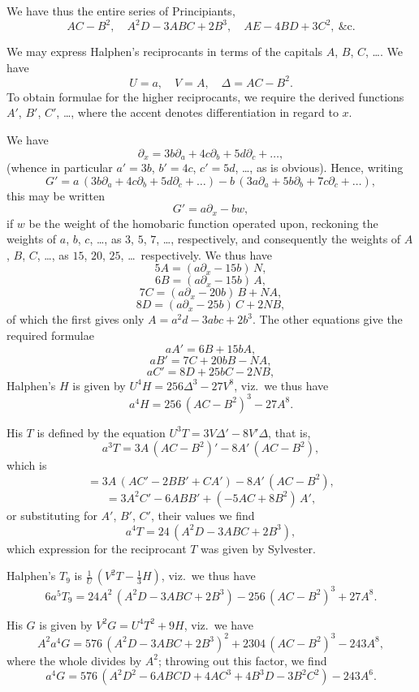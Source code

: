 \documentclass[11pt]{article}
\begin{document}
We have thus the entire series of Principiants,
\[
A C - B^2,\quad A^2 D - 3 A B C + 2 B^3,\quad A E - 4 B D + 3 C^2,\ \&\mathrm{c}.
\]

We may express Halphen's reciprocants in terms of the capitals $A$, $B$, $C$, \ldots. We have
\[
U = a,\quad V = A,\quad \Delta = A C - B^2.
\]
To obtain formulae for the higher reciprocants, we require the derived functions $A'$, $B'$, $C'$, \ldots, where the accent denotes differentiation in regard to $x$.

We have
\[
\partial_x = 3 b\partial_a + 4 c\partial_b + 5 d\partial_c + \ldots,
\]
(whence in particular $a' = 3 b$, $b' = 4 c$, $c' = 5 d$, \ldots, as is obvious). Hence, writing
\[
G' = a\,(3 b\partial_a + 4 c\partial_b + 5 d\partial_c + \ldots) - b\,(3 a\partial_a + 5 b\partial_b + 7 c\partial_c + \ldots),
\]
this may be written
\[
G' = a\partial_x - b w,
\]
if $w$ be the weight of the homobaric function operated upon, reckoning the weights of $a$, $b$, $c$, \ldots, as $3$, $5$, $7$, \ldots, respectively, and consequently the weights of $A$, $B$, $C$, \ldots, as $15$, $20$, $25$, \ldots\ respectively. We thus have
\[
5 A = (a\partial_x - 15 b)\,N,
\]
\[
6 B = (a\partial_x - 15 b)\,A,
\]
\[
7 C = (a\partial_x - 20 b)\,B + N A,
\]
\[
8 D = (a\partial_x - 25 b)\,C + 2 N B,
\]
of which the first gives only $A = a^2 d - 3 a b c + 2 b^3$. The other equations give the required formulae
\[
a A' = 6 B + 15 b A,
\]
\[
a B' = 7 C + 20 b B - N A,
\]
\[
a C' = 8 D + 25 b C - 2 N B,
\]
Halphen's $H$ is given by $U^4 H = 256 \Delta^3 - 27 V^8$, viz.\ we thus have
\[
a^4 H = 256\,(A C - B^2)^3 - 27 A^8.
\]

His $T$ is defined by the equation $U^3 T = 3 V \Delta' - 8 V' \Delta$, that is,
\[
a^3 T = 3 A\,(A C - B^2)' - 8 A'\,(A C - B^2),
\]
which is
\[
= 3 A\,(A C' - 2 B B' + C A') - 8 A'\,(A C - B^2),
\]
\[
= 3 A^2 C' - 6 A B B' + (-5 A C + 8 B^2)\,A',
\]
or substituting for $A'$, $B'$, $C'$, their values we find
\[
a^4 T = 24\,(A^2 D - 3 A B C + 2 B^3),
\]
which expression for the reciprocant $T$ was given by Sylvester.

Halphen's $T_9$ is $\tfrac{1}{U}\,(V^2 T - \tfrac{1}{3} H)$, viz.\ we thus have
\[
6 a^5 T_9 = 24 A^2\,(A^2 D - 3 A B C + 2 B^3) - 256\,(A C - B^2)^3 + 27 A^8.
\]

His $G$ is given by $V^2 G = U^4 T^2 + 9 H$, viz.\ we have
\[
A^2 a^4 G = 576\,(A^2 D - 3 A B C + 2 B^3)^2 + 2304\,(A C - B^2)^3 - 243 A^8,
\]
where the whole divides by $A^2$; throwing out this factor, we find
\[
a^4 G = 576\,(A^2 D^2 - 6 A B C D + 4 A C^3 + 4 B^3 D - 3 B^2 C^2) - 243 A^6.
\]
\end{document}
